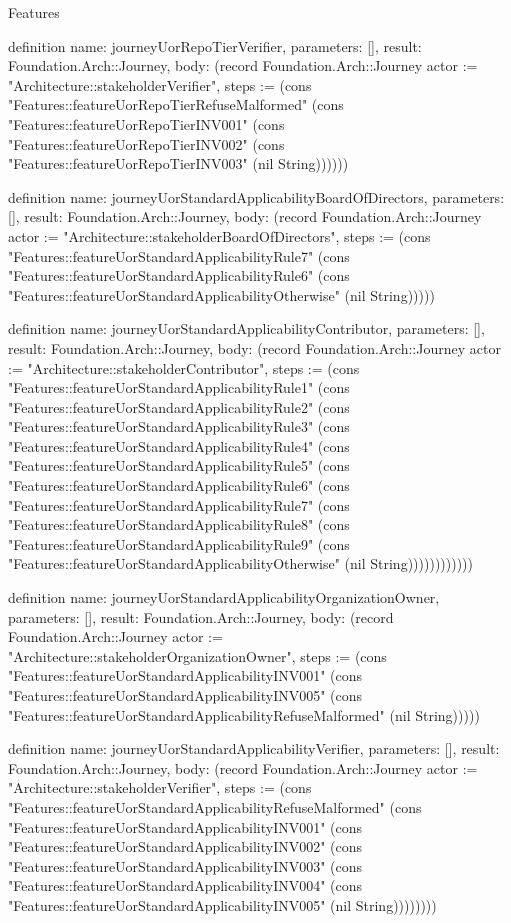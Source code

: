 \begin{lexlean}{Features}
\begin{semanticmodule}
definition{
  name: journeyUorRepoTierVerifier,
  parameters: [],
  result: Foundation.Arch::Journey,
  body: (record Foundation.Arch::Journey {actor := "Architecture::stakeholderVerifier", steps := (cons "Features::featureUorRepoTierRefuseMalformed" (cons "Features::featureUorRepoTierINV001" (cons "Features::featureUorRepoTierINV002" (cons "Features::featureUorRepoTierINV003" (nil String)))))})
}

definition{
  name: journeyUorStandardApplicabilityBoardOfDirectors,
  parameters: [],
  result: Foundation.Arch::Journey,
  body: (record Foundation.Arch::Journey {actor := "Architecture::stakeholderBoardOfDirectors", steps := (cons "Features::featureUorStandardApplicabilityRule7" (cons "Features::featureUorStandardApplicabilityRule6" (cons "Features::featureUorStandardApplicabilityOtherwise" (nil String))))})
}

definition{
  name: journeyUorStandardApplicabilityContributor,
  parameters: [],
  result: Foundation.Arch::Journey,
  body: (record Foundation.Arch::Journey {actor := "Architecture::stakeholderContributor", steps := (cons "Features::featureUorStandardApplicabilityRule1" (cons "Features::featureUorStandardApplicabilityRule2" (cons "Features::featureUorStandardApplicabilityRule3" (cons "Features::featureUorStandardApplicabilityRule4" (cons "Features::featureUorStandardApplicabilityRule5" (cons "Features::featureUorStandardApplicabilityRule6" (cons "Features::featureUorStandardApplicabilityRule7" (cons "Features::featureUorStandardApplicabilityRule8" (cons "Features::featureUorStandardApplicabilityRule9" (cons "Features::featureUorStandardApplicabilityOtherwise" (nil String)))))))))))})
}

definition{
  name: journeyUorStandardApplicabilityOrganizationOwner,
  parameters: [],
  result: Foundation.Arch::Journey,
  body: (record Foundation.Arch::Journey {actor := "Architecture::stakeholderOrganizationOwner", steps := (cons "Features::featureUorStandardApplicabilityINV001" (cons "Features::featureUorStandardApplicabilityINV005" (cons "Features::featureUorStandardApplicabilityRefuseMalformed" (nil String))))})
}

definition{
  name: journeyUorStandardApplicabilityVerifier,
  parameters: [],
  result: Foundation.Arch::Journey,
  body: (record Foundation.Arch::Journey {actor := "Architecture::stakeholderVerifier", steps := (cons "Features::featureUorStandardApplicabilityRefuseMalformed" (cons "Features::featureUorStandardApplicabilityINV001" (cons "Features::featureUorStandardApplicabilityINV002" (cons "Features::featureUorStandardApplicabilityINV003" (cons "Features::featureUorStandardApplicabilityINV004" (cons "Features::featureUorStandardApplicabilityINV005" (nil String)))))))})
}


\end{semanticmodule}
\end{lexlean}
